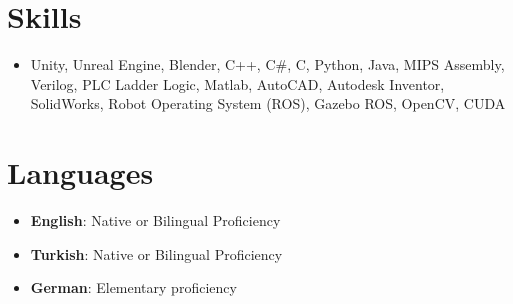 \documentclass[letterpaper,11pt]{article}
\newcommand{\resumeSkillSimple}[1]{
  \item \small{#1}
}
\newcommand{\resumeSkillExperience}[2]{
  \item \small{\textbf{#1}: #2} \vspace{-10pt}
}
\newcommand{\resumeLanguage}[2]{
  \item
    \textbf{#1}: #2 \vspace{-10pt}
}
\newcommand{\resumeSubHeadingListStart}{\begin{itemize}[leftmargin=0.0in, label={}]}
\newcommand{\resumeSubHeadingListEnd}{\end{itemize}}
\begin{document}
\section{Skills}
\begin{itemize}[leftmargin=0.15in, label={}]
  \resumeSkillSimple{Unity, Unreal Engine, Blender, C++, C\#, C, Python, Java, MIPS Assembly, Verilog, PLC Ladder Logic, Matlab, AutoCAD, Autodesk Inventor, SolidWorks, Robot Operating System (ROS), Gazebo ROS, OpenCV, CUDA}
\end{itemize}
\vspace{-20pt}


\section{Languages}
  \resumeSubHeadingListStart
    \resumeLanguage
      {English}{Native or Bilingual Proficiency}
    \resumeLanguage
      {Turkish}{Native or Bilingual Proficiency}
    \resumeLanguage
      {German}{Elementary proficiency}
  \resumeSubHeadingListEnd
\vspace{-10pt}
\end{document}
